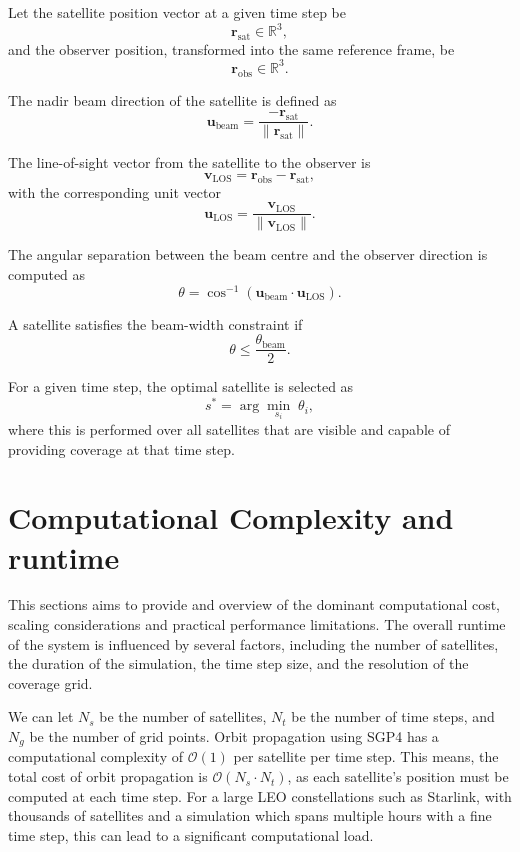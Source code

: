 Let the satellite position vector at a given time step be
\[
\mathbf{r}_{\text{sat}} \in \mathbb{R}^3,
\]
and the observer position, transformed into the same reference frame, be
\[
\mathbf{r}_{\text{obs}} \in \mathbb{R}^3.
\]

The nadir beam direction of the satellite is defined as
\[
\mathbf{u}_{\text{beam}}
= \frac{-\mathbf{r}_{\text{sat}}}{\lVert \mathbf{r}_{\text{sat}} \rVert}.
\]

The line-of-sight vector from the satellite to the observer is
\[
\mathbf{v}_{\text{LOS}} = \mathbf{r}_{\text{obs}} - \mathbf{r}_{\text{sat}},
\]
with the corresponding unit vector
\[
\mathbf{u}_{\text{LOS}}
= \frac{\mathbf{v}_{\text{LOS}}}{\lVert \mathbf{v}_{\text{LOS}} \rVert}.
\]

The angular separation between the beam centre and the observer direction is computed as
\[
\theta = \cos^{-1}\!\left(
\mathbf{u}_{\text{beam}} \cdot \mathbf{u}_{\text{LOS}}
\right).
\]

A satellite satisfies the beam-width constraint if
\[
\theta \leq \frac{\theta_{\text{beam}}}{2}.
\]

For a given time step, the optimal satellite is selected as
\[
s^\ast = \arg\min_{s_i} \; \theta_i,
\]
where this is performed over all satellites that are visible and capable of providing coverage at that time step. 

\section{Computational Complexity and runtime}
This sections aims to provide and overview of the dominant computational cost, scaling considerations and practical performance limitations. The overall runtime of the system is influenced by several factors, including the number of satellites, the duration of the simulation, the time step size, and the resolution of the coverage grid. 

We can let $N_s$ be the number of satellites, $N_t$ be the number of time steps, and $N_g$ be the number of grid points. Orbit propagation using SGP4 has a computational complexity of  $\mathcal{O}(1)$ per satellite per time step. This means, the total cost of orbit propagation is $\mathcal{O}(N_s \cdot N_t)$, as each satellite's position must be computed at each time step. For a large LEO constellations such as Starlink, with thousands of satellites and a simulation which spans multiple hours with a fine time step, this can lead to a significant computational load.

